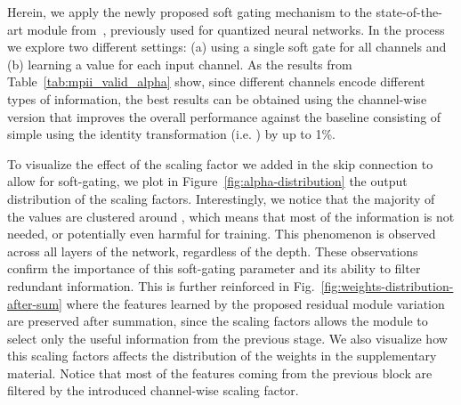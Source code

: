 \documentclass[a4paper, 10pt, conference]{ieeeconf}      \usepackage{FG2020}
\begin{document}
\begin{table}[!htbp]
   \begin{center}
    \end{center}
    \caption{PCKh-based on the MPII validation set for the medium speed regime domain.}
    \label{tab:mpii_valid_normal}
\end{table}

Herein, we apply the newly proposed soft gating mechanism to the state-of-the-art module from~\cite{bulat2017binarized}, previously used for quantized neural networks. In the process we explore two different settings: (a) using a single soft gate for all channels and (b) learning a value for each input channel. As the results from Table~\ref{tab:mpii_valid_alpha} show, since different channels encode different types of information, the best results can be obtained using the channel-wise version that improves the overall performance against the baseline consisting of simple using the identity transformation (i.e. ) by up to 1\%. 

To visualize the effect of the scaling factor we added in the skip connection to allow for soft-gating, we plot in Figure~\ref{fig:alpha-distribution} the output distribution of the scaling factors. Interestingly, we notice that the majority of the values are clustered around , which means that most of the information is not needed, or potentially even harmful for training. This phenomenon is observed across all layers of the network, regardless of the depth. These observations confirm the importance of this soft-gating parameter and its ability to filter redundant information. This is further reinforced in Fig.~\ref{fig:weights-distribution-after-sum} where the features learned by the proposed residual module variation are preserved after summation, since the scaling factors allows the module to select only the useful information from the previous stage. We also visualize how this scaling factors affects the distribution of the weights in the supplementary material. Notice that most of the features coming from the previous block are filtered by the introduced channel-wise scaling factor.
\end{document}

